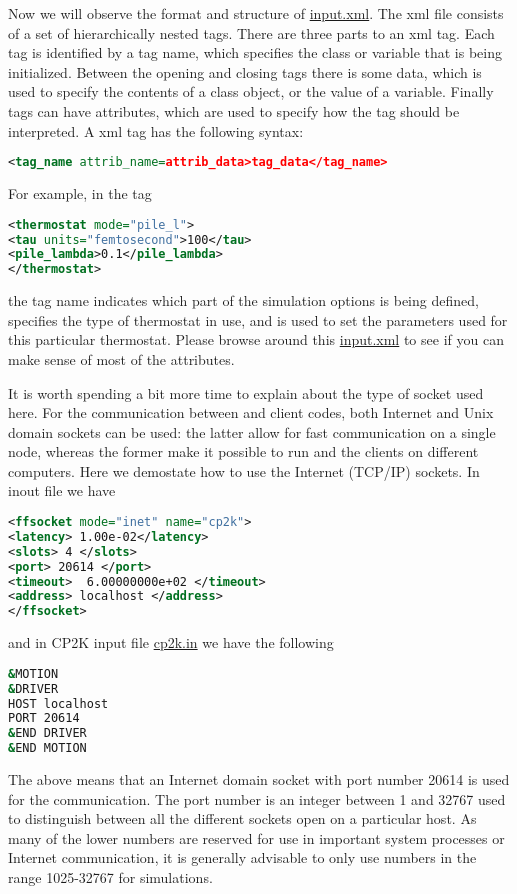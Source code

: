 \documentclass{article}
\begin{document}
\begin{Exercise}[label={inputs},title={Keywords, outputs, and units of \ipi{}}]
\Question
Now we will observe the format and structure of \url{input.xml}.
The xml file consists of a set of hierarchically nested tags. There are three
parts to an xml tag. Each tag is identified by a tag name, which specifies the class
or variable that is being initialized. Between the opening and closing tags there is some data, 
which is used to specify the
contents of a class object, or the value of a variable. Finally tags can have attributes,
which are used to specify how the tag should be interpreted.
A xml tag has the following syntax:
\begin{lstlisting}[language=xml]
<tag_name attrib_name=attrib_data>tag_data</tag_name>
\end{lstlisting}
For example, in the tag
\begin{lstlisting}[language=xml]
<thermostat mode="pile_l">
<tau units="femtosecond">100</tau> 
<pile_lambda>0.1</pile_lambda>
</thermostat>
\end{lstlisting}
the tag name  indicates which part of the simulation options is being defined,
 specifies the type of thermostat in use,
and  is used to set the parameters used for this particular thermostat.
Please browse around this \url{input.xml} to see if you can make sense of most of the attributes.

\Question
It is worth spending a bit more time to explain about the type of socket used here.
For the communication between \ipi{} and client codes, both Internet and Unix domain sockets can be used: the
latter allow for fast communication on a single node, whereas the former make it possible
to run \ipi{} and the clients on different computers.
Here we demostate how to use the Internet (TCP/IP) sockets.
In \ipi{} inout file we have
\begin{lstlisting}[language=xml]
<ffsocket mode="inet" name="cp2k">
<latency> 1.00e-02</latency>
<slots> 4 </slots>
<port> 20614 </port>
<timeout>  6.00000000e+02 </timeout>
<address> localhost </address>
</ffsocket> 
\end{lstlisting}
and in CP2K input file \url{cp2k.in} we have the following
\begin{lstlisting}[language=bash]
&MOTION
&DRIVER
HOST localhost
PORT 20614
&END DRIVER
&END MOTION
\end{lstlisting}
The above means that an Internet domain socket with port number 20614 is used for the communication.
The port number is an integer between 1 and 32767 used to distinguish between all the
different sockets open on a particular host. As many of the lower numbers are reserved
for use in important system processes or Internet communication, it is generally advisable
to only use numbers in the range 1025-32767 for simulations.


\end{Exercise}
\end{document}
